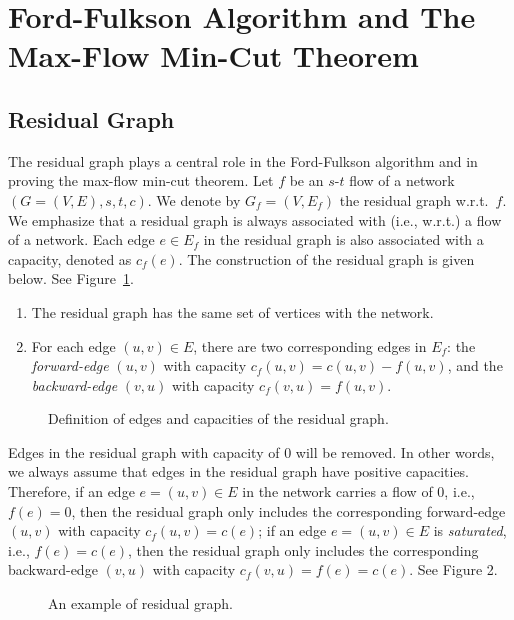 \documentclass[letterpaper,11pt]{article}
\theoremstyle{mytheorem}
\begin{document}
\section*{Ford-Fulkson Algorithm and The Max-Flow Min-Cut Theorem}

\subsection*{Residual Graph}

The residual graph plays a central role in the Ford-Fulkson algorithm and in
proving the max-flow min-cut theorem. Let $f$ be an $s$-$t$ flow of a network
$(G = (V,E),s,t,c)$. We denote by $G_f =(V,E_f)$ the residual graph w.r.t.\ $f$. 
We emphasize that a residual graph is always associated with (i.e., w.r.t.) a flow of a network.
Each edge $e\in E_f$ in the residual graph is also associated with a capacity, denoted as $c_f(e)$. 
The construction of the residual graph is given below.  See Figure~\ref{fig:residual}.
\vspace*{-\topsep}
\begin{enumerate}
\item The residual graph has the same set of vertices with the network.
\item For each edge $(u,v)\in E$, there are two corresponding edges in
$E_f$: the \emph{forward-edge} $(u,v)$ with capacity $c_f (u, v) = c(u,v) - f(u,v)$, 
and the \emph{backward-edge} $(v, u)$ with capacity $c_f (v, u) = f(u,v)$. 
\end{enumerate}

\begin{figure}[h]
\centering{}
\caption{Definition of edges and capacities of the residual graph.}
\label{fig:residual}
\end{figure}

Edges in the residual graph with capacity of 0 will be removed. In other words,
we always assume that edges in the residual graph have positive
capacities. Therefore, if an edge $e = (u,v) \in E$ in the network carries a
flow of 0, i.e., $f(e) = 0$, then the residual graph only includes the
corresponding forward-edge $(u, v)$ with capacity $c_f (u, v) = c(e)$; if an
edge $e = (u, v) \in E$  is \emph{saturated}, i.e., $f (e) = c(e)$, then the residual
graph only includes the corresponding backward-edge $(v, u)$ with capacity
$c_f (v, u) = f(e) = c(e)$. See Figure 2.

\begin{figure}[h]
\centering{}
\caption{An example of residual graph.}
\label{fig:example}
\end{figure}
\end{document}
